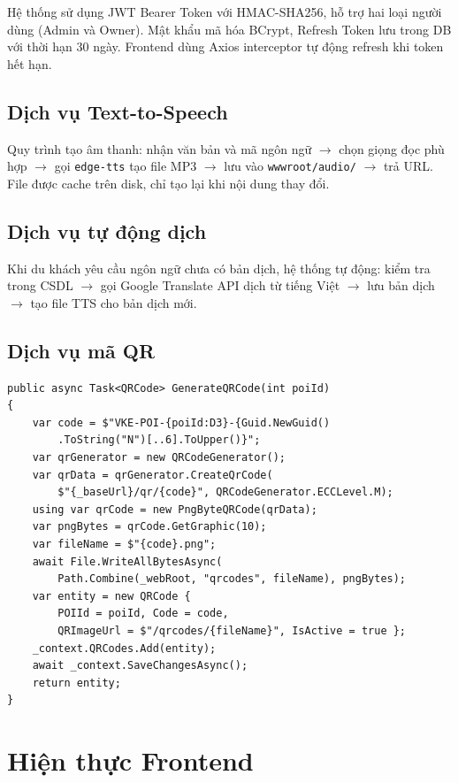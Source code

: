 \documentclass[a4paper,13pt]{report}
\begin{document}
Hệ thống sử dụng JWT Bearer Token với HMAC-SHA256, hỗ trợ hai loại người dùng (Admin và Owner). Mật khẩu mã hóa BCrypt, Refresh Token lưu trong DB với thời hạn 30 ngày. Frontend dùng Axios interceptor tự động refresh khi token hết hạn.

\subsection{Dịch vụ Text-to-Speech}

Quy trình tạo âm thanh: nhận văn bản và mã ngôn ngữ $\rightarrow$ chọn giọng đọc phù hợp $\rightarrow$ gọi \texttt{edge-tts} tạo file MP3 $\rightarrow$ lưu vào \texttt{wwwroot/audio/} $\rightarrow$ trả URL. File được cache trên disk, chỉ tạo lại khi nội dung thay đổi.

\subsection{Dịch vụ tự động dịch}

Khi du khách yêu cầu ngôn ngữ chưa có bản dịch, hệ thống tự động: kiểm tra trong CSDL $\rightarrow$ gọi Google Translate API dịch từ tiếng Việt $\rightarrow$ lưu bản dịch $\rightarrow$ tạo file TTS cho bản dịch mới.

\subsection{Dịch vụ mã QR}

\begin{lstlisting}[language={[Sharp]C}, caption={Tạo mã QR cho POI}]
public async Task<QRCode> GenerateQRCode(int poiId)
{
    var code = $"VKE-POI-{poiId:D3}-{Guid.NewGuid()
        .ToString("N")[..6].ToUpper()}";
    var qrGenerator = new QRCodeGenerator();
    var qrData = qrGenerator.CreateQrCode(
        $"{_baseUrl}/qr/{code}", QRCodeGenerator.ECCLevel.M);
    using var qrCode = new PngByteQRCode(qrData);
    var pngBytes = qrCode.GetGraphic(10);
    var fileName = $"{code}.png";
    await File.WriteAllBytesAsync(
        Path.Combine(_webRoot, "qrcodes", fileName), pngBytes);
    var entity = new QRCode {
        POIId = poiId, Code = code,
        QRImageUrl = $"/qrcodes/{fileName}", IsActive = true };
    _context.QRCodes.Add(entity);
    await _context.SaveChangesAsync();
    return entity;
}
\end{lstlisting}

\section{Hiện thực Frontend}
\end{document}

